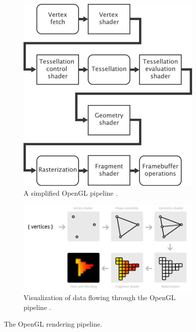\documentclass{article}
\begin{document}
\begin{figure}[h]
    \centering
    \begin{subfigure}[b]{0.29\textwidth}
    	\includegraphics[width=\textwidth]{pipeline}
    	\caption{A simplified OpenGL pipeline \cite{sellers2016}.}
    	\label{fig:pipeline-flow}
    \end{subfigure}
    \begin{subfigure}[b]{0.49\textwidth}
	    \includegraphics[width=\textwidth]{pipeline-visualized}
	    \caption{Visualization of data flowing through the OpenGL pipeline \cite{overvoorde2019}.}
	    \label{fig:pipeline-visualized}
    \end{subfigure}
	\caption{The OpenGL rendering pipeline.}
	\label{fig:pipeline}
\end{figure}
\end{document}
